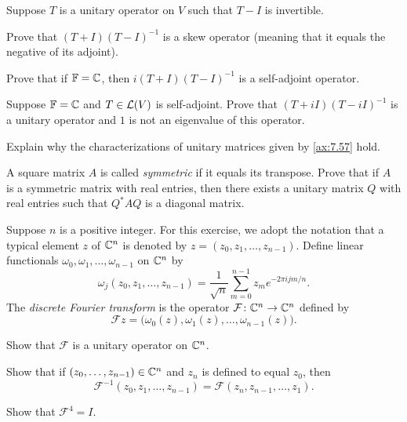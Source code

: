\begin{exc}
\begin{exercise}
Suppose $T$ is a unitary operator on $V$ such that $T-I$ is invertible.
\begin{parts}
\item Prove that $(T+I)(T-I)^{-1}$ is a skew operator (meaning that it equals
  the negative of its adjoint).
\item Prove that if $\mathbb{F}=\mathbb{C}$, then $i(T+I)(T-I)^{-1}$ is a self-adjoint
  operator.
\end{parts}
\end{exercise}

\begin{exercise}
Suppose $\mathbb{F}=\mathbb{C}$ and $T\in\mathcal{L}(V)$ is self-adjoint. Prove that
$(T+iI)(T-iI)^{-1}$ is a unitary operator and $1$ is not an eigenvalue of this
operator.
\end{exercise}

\begin{exercise}
Explain why the characterizations of unitary matrices given by \ref{ax:7.57}
hold.
\end{exercise}

\begin{exercise}
A square matrix $A$ is called \emph{symmetric} if it equals its transpose. Prove
that if $A$ is a symmetric matrix with real entries, then there exists a unitary
matrix $Q$ with real entries such that $Q^*AQ$ is a diagonal matrix.
\end{exercise}

\begin{exercise}
Suppose $n$ is a positive integer. For this exercise, we adopt the notation that
a typical element $z$ of $\mathbb{C}^n$ is denoted by $z=(z_0,z_1,\dots,z_{n-1})$.
Define linear functionals $\omega_0,\omega_1,\dots,\omega_{n-1}$ on $\mathbb{C}^n$ by
\[ \omega_j(z_0,z_1,\dots,z_{n-1})
   =\frac{1}{\sqrt{n}}\sum_{m=0}^{n-1}z_me^{-2\pi ijm/n}. \]
The \emph{discrete Fourier transform} is the operator
$\mathcal{F}\colon\mathbb{C}^n\to\mathbb{C}^n$ defined by
\[ \mathcal{F}z=\bigl(\omega_0(z),\omega_1(z),\dots,\omega_{n-1}(z)\bigr). \]
\begin{parts}
\item Show that $\mathcal{F}$ is a unitary operator on $\mathbb{C}^n$.
\item Show that if $(z_0,\dots,z_{n-1})\in\mathbb{C}^n$ and $z_n$ is defined to equal
  $z_0$, then
  \[ \mathcal{F}^{-1}(z_0,z_1,\dots,z_{n-1})=\mathcal{F}(z_n,z_{n-1},\dots,z_1). \]
\item Show that $\mathcal{F}^4=I$.
\end{parts}
\end{exercise}


\end{exc}
